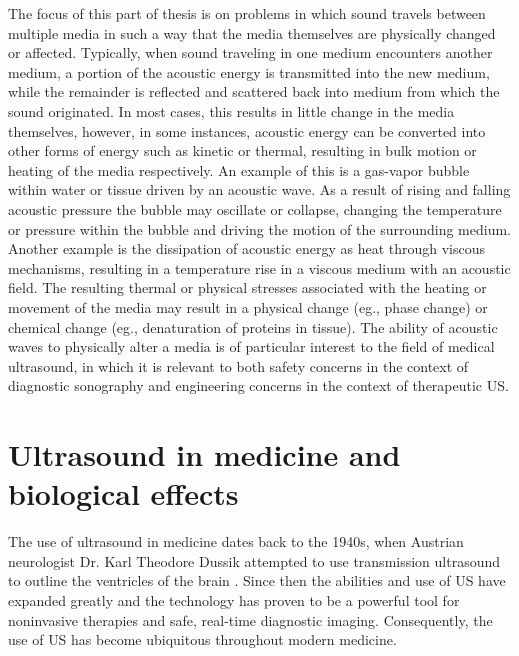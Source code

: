 The focus of this part of thesis is on problems in which sound travels
between multiple media in such a way that the media themselves are
physically changed or affected. Typically, when sound traveling in one
medium encounters another medium, a portion of the acoustic energy is
transmitted into the new medium, while the remainder is reflected
and scattered back into medium from which the sound originated. In
most cases, this results in little change in the media themselves,
however, in some instances, acoustic energy can be converted into
other forms of energy such as kinetic or thermal, resulting in bulk
motion or heating of the media respectively. An example of this is a
gas-vapor bubble within water or tissue driven by an acoustic wave. As a result
of rising and falling acoustic pressure the bubble may oscillate or
collapse, changing the temperature or pressure within the bubble and
driving the motion of the surrounding medium. Another example is the
dissipation of acoustic energy as heat through viscous mechanisms,
resulting in a temperature rise in a viscous medium with an acoustic
field. The resulting thermal or physical stresses associated with the
heating or movement of the media may result in a physical change (eg.,
phase change) or chemical change (eg., denaturation of proteins in
tissue). The ability of acoustic waves to physically alter a media is
of particular interest to the field of medical ultrasound, in which it
is relevant to both safety concerns in the context of diagnostic
sonography and engineering concerns in the context of therapeutic
\ac{US}.

\section{Ultrasound in medicine and biological effects}
The use of ultrasound in medicine dates back to the 1940s, when
Austrian neurologist Dr. Karl Theodore Dussik attempted to use
transmission ultrasound to outline the ventricles of the brain
\citep{Dussik1942,Singh2007}. Since then the abilities and use of
\ac{US} have expanded greatly and the technology has proven to be a
powerful tool for noninvasive therapies and safe, real-time diagnostic
imaging. Consequently, the use of \ac{US} has become ubiquitous
throughout modern medicine.

